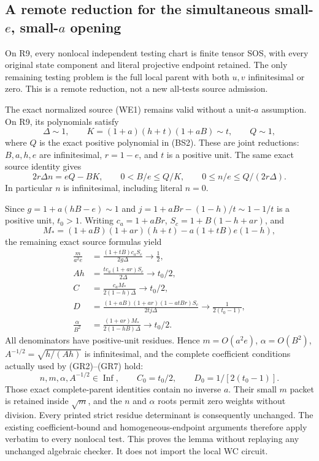 \subsection{A remote reduction for the simultaneous small-$e$, small-$a$ opening}
\label{sec:r13-joint-a-e-remote}

\begin{lemma}
On R9, every nonlocal independent testing chart is finite tensor
SOS, with every original state component and literal projective
endpoint retained. The only remaining testing problem is the full
local parent with both $u,v$ infinitesimal or zero. This is a remote
reduction, not a new all-tests source admission.
\end{lemma}

The exact normalized source (WE1) remains valid without a unit-$a$
assumption. On R9, its polynomials satisfy
\[
 \Delta\sim1,\qquad
 K=(1+a)(h+t)(1+aB)\sim t,\qquad Q\sim1,               \tag{WF4}
\]
where $Q$ is the exact positive polynomial in (BS2). These are
joint reductions: $B,a,h,e$ are infinitesimal, $r=1-e$, and $t$
is a positive unit. The same exact source identity gives
\[
 2r\Delta n=eQ-BK,\qquad
 0<B/e\le Q/K,\qquad 0\le n/e\le Q/(2r\Delta).        \tag{WF5}
\]
In particular $n$ is infinitesimal, including literal $n=0$.

Since $g=1+a(hB-e)\sim1$ and
$j=1+aBr-(1-h)/t\sim1-1/t$ is a positive unit, $t_0>1$.
Writing $c_a=1+aBr$, $S_c=1+B(1-h+ar)$, and
\[
 M_*=(1+aB)(1+ar)(h+t)-a(1+tB)e(1-h),
\]
the remaining exact source formulas yield
\[
\begin{aligned}
 \frac{m}{a^2e}
 &=\frac{(1+tB)c_aS_c}{2g\Delta}\longrightarrow\frac12,\\
 Ah&=\frac{tc_a(1+ar)S_c}{2\Delta}\longrightarrow t_0/2,\\
 C&=\frac{c_aM_*}{2(1-h)\Delta}\longrightarrow t_0/2,\\
 D&=\frac{(1+aB)(1+ar)(1-atBr)S_c}{2tj\Delta}
                                  \longrightarrow\frac1{2(t_0-1)},\\
 \frac{\alpha}{B^2}
 &=\frac{(1+ar)M_*}{2(1-hB)\Delta}\longrightarrow t_0/2.
\end{aligned}                                                     \tag{WF6}
\]
All denominators have positive-unit residues. Hence
$m=O(a^2e)$, $\alpha=O(B^2)$, $A^{-1/2}=\sqrt{h/(Ah)}$ is
infinitesimal, and the complete coefficient conditions actually
used by (GR2)--(GR7) hold:
\[
 n,m,\alpha,A^{-1/2}\in\operatorname{Inf},\qquad
 C_0=t_0/2,\qquad D_0=1/[2(t_0-1)].                  \tag{WF7}
\]
Those exact complete-parent identities contain no inverse $a$.
Their small $m$ packet is retained inside $\sqrt m$, and the
$n$ and $\alpha$ roots permit zero weights without division.
Every printed strict residue determinant is consequently unchanged.
The existing coefficient-bound and homogeneous-endpoint arguments
therefore apply verbatim to every nonlocal test. This proves the
lemma without replaying any unchanged algebraic checker. It does
not import the local WC circuit.

